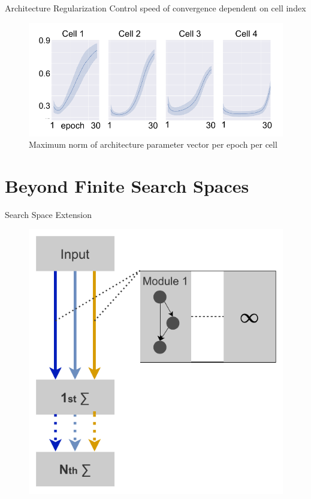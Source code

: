 \documentclass[]{beamer}
\begin{document}
\begin{frame}{Architecture Regularization}
\vspace{10pt}
Control speed of convergence dependent on cell index
\vfill
\begin{figure}
    \includegraphics[scale=0.75, center]{graphics/alpha_curves.pdf}
    \caption{Maximum norm of architecture parameter vector per epoch per cell}
\end{figure}
\end{frame}

\section{Beyond Finite Search Spaces}
\begin{frame}{Search Space Extension}
\vspace{10pt}
\vfill
\begin{figure}
    \begin{center}
    \includegraphics[scale=0.75]{graphics/search_space_extension.pdf}
    \caption{}
  \end{center} 
\end{figure}
\end{frame}
\end{document}
